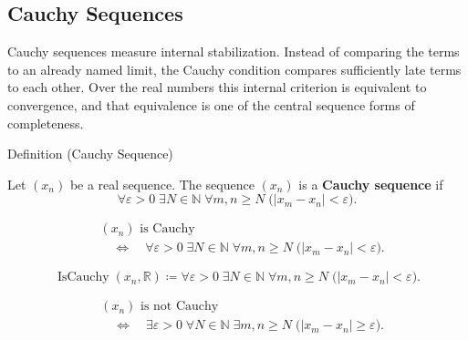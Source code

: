 \subsection*{Cauchy Sequences}

\begin{exposition}
Cauchy sequences measure internal stabilization. Instead of comparing the
terms to an already named limit, the Cauchy condition compares sufficiently
late terms to each other. Over the real numbers this internal criterion is
equivalent to convergence, and that equivalence is one of the central
sequence forms of completeness.
\end{exposition}


\begin{definitionbox}{Definition (Cauchy Sequence)}
\begin{definition}
\label{def:cauchy-sequence}
Let $(x_n)$ be a real sequence. The sequence $(x_n)$ is a
\textbf{Cauchy sequence} if
\[
  \forall \varepsilon>0 \;\exists N\in\mathbb{N}\;\forall m,n\ge N
  \;\bigl(|x_m-x_n|<\varepsilon\bigr).
\]
\end{definition}
\end{definitionbox}

\begin{remark*}
\[
\begin{aligned}
&(x_n)\text{ is Cauchy}\\
&\quad\Longleftrightarrow\quad
\forall \varepsilon>0 \;\exists N\in\mathbb{N}\;\forall m,n\ge N
\;\bigl(|x_m-x_n|<\varepsilon\bigr).
\end{aligned}
\]
\end{remark*}

\begin{remark*}
\[
\operatorname{IsCauchy}(x_n,\mathbb{R})
\coloneqq
\forall \varepsilon>0 \;\exists N\in\mathbb{N}\;\forall m,n\ge N
\;\bigl(|x_m-x_n|<\varepsilon\bigr).
\]
\end{remark*}

\begin{remark*}
\[
\begin{aligned}
&(x_n)\text{ is not Cauchy}\\
&\quad\Longleftrightarrow\quad
\exists \varepsilon>0 \;\forall N\in\mathbb{N}\;\exists m,n\ge N
\;\bigl(|x_m-x_n|\ge\varepsilon\bigr).
\end{aligned}
\]
\end{remark*}

